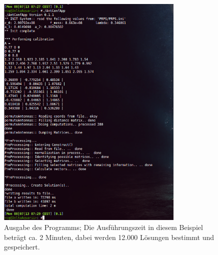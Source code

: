 \begin{figure} [h]
         \centering
         \caption{Ausgabe des Programms; Die Ausführungszeit in diesem Beispiel beträgt ca. 2 Minuten, dabei werden 12.000 Lösungen bestimmt und gespeichert.  }
         \label{fig:Program_Output}
         \includegraphics[width=0.8\textwidth]{common/img/Program_Output_12k_results-via-parallel.png}
%
\end{figure}
